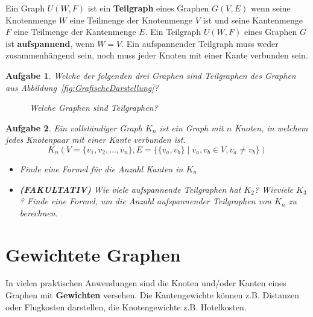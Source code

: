 \documentclass[12pt,a4paper]{report}
\theoremstyle{break}
\newtheorem{exercise}{Aufgabe}[chapter]
\theoremstyle{plain}
\begin{document}
Ein Graph $U(W,F)$ ist ein \textbf{Teilgraph} eines Graphen $G(V,E)$
wenn seine Knotenmenge $W$ eine Teilmenge der Knotenmenge $V$ ist und
seine Kantenmenge $F$ eine Teilmenge der Kantenmenge $E$.
Ein Teilgraph $U(W,F)$ eines Graphen $G$ ist \textbf{aufspannend}, 
wenn $W=V$. Ein aufspannender Teilgraph muss weder zusammenh\"{a}ngend sein, noch muss jeder Knoten mit einer Kante verbunden sein.
\begin{exercise}\label{exunter}
Welche der folgenden drei Graphen sind Teilgraphen des Graphen aus
Abbildung~\ref{fig:GrafischeDarstellung}?

\begin{figure}[H]
\begin{subfigure}[b]{0.3\textwidth}
\caption{}
\end{subfigure}
\begin{subfigure}[b]{0.3\textwidth}
\caption{}
\end{subfigure}
\begin{subfigure}[b]{0.3\textwidth}
\caption{}
\end{subfigure}

\caption{Welche Graphen sind Teilgraphen?}
\end{figure}

\end{exercise}
\begin{exercise}\label{excompletesubgraph}
Ein \emph{vollst\"{a}ndiger} Graph $K_n$ ist ein Graph mit $n$ Knoten, in welchem jedes Knotenpaar mit einer Kante verbunden ist.
\[ 
K_n(V = \{v_1, v_2, \ldots, v_n\}, E = \{\{v_a, v_b\} \mid v_a, v_b \in V,
v_a \neq v_b\})
\] 
\begin{itemize}
\item Finde eine Formel f\"ur die Anzahl Kanten in $K_n$
\item \textbf{(FAKULTATIV)} Wie viele aufspannende Teilgraphen hat
  $K_2$? Wieviele $K_3$? Finde eine Formel, um die Anzahl
  aufspannender Teilgraphen von $K_n$ zu berechnen.
\end{itemize}
\end{exercise}

\newpage
\section{Gewichtete Graphen}
\label{gewichtet}

In vielen praktischen Anwendungen sind die Knoten und/oder Kanten
eines Graphen mit \textbf{Gewichten} versehen. Die Kantengewichte k\"{o}nnen
z.B. Distanzen oder Flugkosten darstellen, die Knotengewichte
z.B. Hotelkosten.
\end{document}
